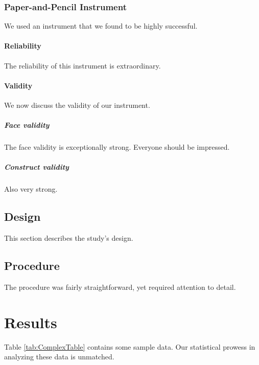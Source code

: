 \documentclass[stu,floatsintext]{apa7}
\begin{document}
\subsubsection{Paper-and-Pencil Instrument}
We used an instrument that we found to be highly successful.

\paragraph{Reliability}
The reliability of this instrument is extraordinary.

\paragraph{Validity}
We now discuss the validity of our instrument.

\subparagraph{Face validity} The face validity is exceptionally
strong.  Everyone should be impressed.

\subparagraph{Construct validity} Also very strong.

\subsection{Design}
This section describes the study’s design.

\subsection{Procedure}
The procedure was fairly straightforward, yet required
attention to detail.

\section{Results}
Table \ref{tab:ComplexTable} contains some sample data.  Our
statistical prowess in analyzing these data is unmatched.
\end{document}
